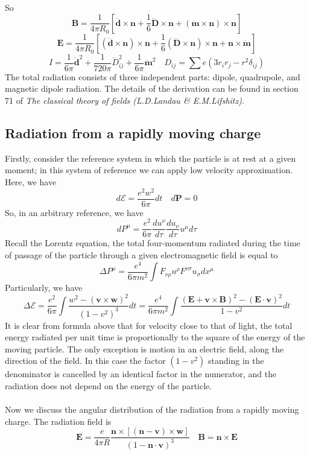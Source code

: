So
\[\bm{B} = \frac{1}{4\pi R_0} \left[ \ddot{\bm{d}} \times \bm{n} + \frac{1}{6}\dddot{\bm{D}}\times\bm{n} + (\ddot{\bm{m}}\times\bm{n})\times\bm{n}\right]\]
\[\bm{E} = \frac{1}{4\pi R_0} \left[ (\ddot{\bm{d}} \times \bm{n})\times \bm{n} + \frac{1}{6}(\dddot{\bm{D}}\times\bm{n})\times \bm{n} + \bm{n} \times \ddot{\bm{m}}\right]\]
\[I = \frac{1}{6\pi}\ddot{\bm{d}}^2 + \frac{1}{720\pi} \dddot{D}_{ij}^2 + \frac{1}{6\pi} \ddot{\bm{m}}^2 \quad D_{ij} = \sum e(3r_{i}r_{j}-r^2\delta_{ij})\]
The total radiation consists of three independent parts:
dipole, quadrupole, and magnetic dipole radiation. The details of the derivation can be found in section 71 of \emph{The classical theory of fields (L.D.Landau \& E.M.Lifshitz)}.

\subsection{Radiation from a rapidly moving charge}
Firstly, consider the reference system in which the particle is at rest at a given moment; in this system of reference we can apply low velocity approximation. Here, we have
\[d\mathcal{E} = \frac{e^2 w^2}{6\pi}dt \quad d\bm{P} = 0\]
So, in an arbitrary reference, we have
\[dP^{\mu} = \frac{e^2}{6\pi} \frac{du^{\nu}}{d\tau} \frac{du_{\nu}}{d\tau} u^{\mu}d\tau\]
Recall the Lorentz equation, the total four-momentum radiated during the time of passage of the particle through a given electromagnetic field is equal to
\[\Delta P^{\mu} = \frac{e^4}{6\pi m^2} \int F_{\nu\rho}u^{\rho} F^{\nu\sigma}u_{\sigma} dx^{\mu}\]
Particularly, we have
\[\Delta \mathcal{E} = \frac{e^2}{6\pi} \int \frac{w^2 - (\bm{v} \times \bm{w})^2}{(1-v^2)^3} dt = \frac{e^4}{6\pi m^2} \int \frac{(\bm{E} + \bm{v} \times \bm{B})^2-(\bm{E} \cdot \bm{v})^2}{1-v^2} dt\]
It is clear from formula above that for velocity close to that of light, the total energy radiated per unit time is proportionally to the square of the energy of the moving particle. The only exception is motion in an electric field, along the direction of the field. In this case the factor $(1-v^2)$ standing in the denominator is cancelled by an identical factor in the numerator, and the radiation does not depend on the energy of the particle.
\\ \\
Now we discuss the angular distribution of the radiation from a rapidly moving charge. The radiation field is
\[\bm{E} = \frac{e}{4\pi R} \frac{\bm{n} \times \left[(\bm{n} - \bm{v}) \times \bm{w} \right]}{(1 - \bm{n} \cdot \bm{v})^3}  \quad \bm{B} = \bm{n} \times \bm{E}\]
